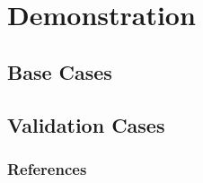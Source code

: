 \documentclass[9pt]{beamer}
\begin{document}
\section{Demonstration}
\subsection{Base Cases}

\subsection{Validation Cases}




\begin{frame}[allowframebreaks]
  \frametitle{References}
  
  {\footnotesize }
\end{frame}


\end{document}

